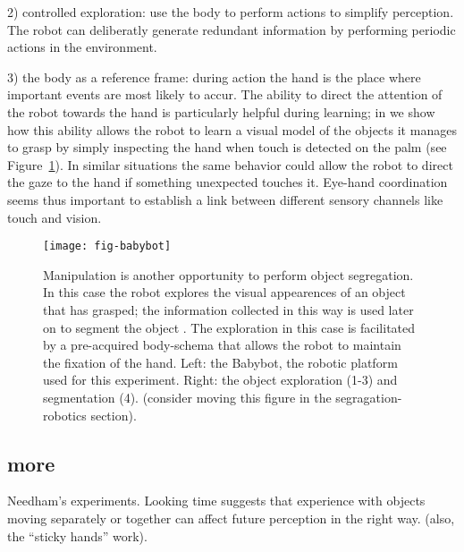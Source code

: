 2) controlled exploration: use the body to perform actions to simplify perception. The robot can deliberatly generate redundant information by performing periodic actions in the environment.

3) the body as a reference frame: during action the hand is the place where important events are most likely to accur. The ability to direct the attention of the robot towards the hand is particularly helpful during learning; in \cite{natale05exploring} we show how this ability allows the robot to learn a visual model of the objects it manages to grasp by simply inspecting the hand when touch is detected on the palm (see Figure~\ref{fig:babybot}). In similar situations the same behavior could allow the robot to direct the gaze to the hand if something unexpected touches it. Eye-hand coordination seems thus important to establish a link between different sensory channels like touch and vision.


\begin{figure}[t]

\centerline{
\texttt{[image: fig-babybot]}
}

\caption{
%
Manipulation is another opportunity to perform object segregation. In this case the robot explores the visual appearences of an object that has grasped; the information collected in this way is used later on to segment the object \cite{natale05exploring}. The exploration in this case is facilitated by a pre-acquired body-schema that allows the robot to maintain the fixation of the hand. Left: the Babybot, the robotic platform used for this experiment. Right: the object exploration (1-3) and segmentation (4). (consider moving this figure in the segragation-robotics section). 
%
}

\label{fig:babybot}

\end{figure}

\subsection{more}

Needham's experiments. 
\cite{needham01object,needham97object}
Looking time suggests that experience with objects moving separately
or together can affect future perception in the right way.
(also, the ``sticky hands'' work).
